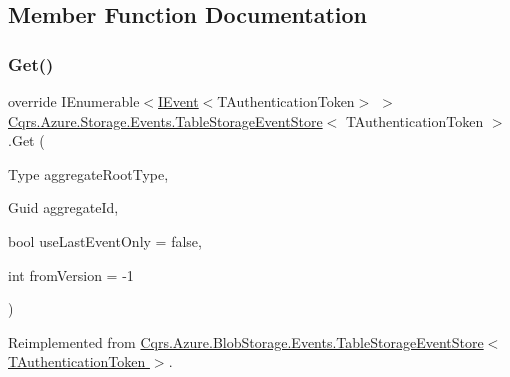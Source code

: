\subsection{Member Function Documentation}
\mbox{\label{classCqrs_1_1Azure_1_1Storage_1_1Events_1_1TableStorageEventStore_a089514182da7a70f35f9237c521c49f0_a089514182da7a70f35f9237c521c49f0}} 
\subsubsection{\texorpdfstring{Get()}{Get()}\hspace{0.1cm}{\footnotesize\ttfamily [1/2]}}
{\footnotesize\ttfamily override I\+Enumerable$<$\hyperlink{interfaceCqrs_1_1Events_1_1IEvent}{I\+Event}$<$T\+Authentication\+Token$>$ $>$ \hyperlink{classCqrs_1_1Azure_1_1Storage_1_1Events_1_1TableStorageEventStore}{Cqrs.\+Azure.\+Storage.\+Events.\+Table\+Storage\+Event\+Store}$<$ T\+Authentication\+Token $>$.Get (\begin{DoxyParamCaption}\item[{Type}]{aggregate\+Root\+Type,  }\item[{Guid}]{aggregate\+Id,  }\item[{bool}]{use\+Last\+Event\+Only = {\ttfamily false},  }\item[{int}]{from\+Version = {\ttfamily -\/1} }\end{DoxyParamCaption})\hspace{0.3cm}{\ttfamily [virtual]}}



Reimplemented from \hyperlink{classCqrs_1_1Azure_1_1BlobStorage_1_1Events_1_1TableStorageEventStore_a420c94c86d8d1c2959aee8602f43c0c0_a420c94c86d8d1c2959aee8602f43c0c0}{Cqrs.\+Azure.\+Blob\+Storage.\+Events.\+Table\+Storage\+Event\+Store$<$ T\+Authentication\+Token $>$}.

\mbox{\label{classCqrs_1_1Azure_1_1Storage_1_1Events_1_1TableStorageEventStore_a1b436bbb111b14b85ee6ba7f90fb1a35_a1b436bbb111b14b85ee6ba7f90fb1a35}} 
